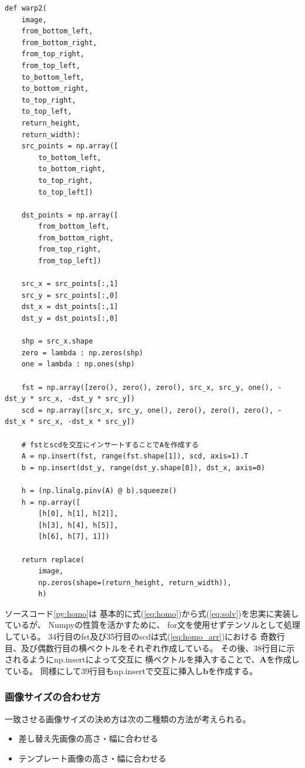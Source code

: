 \begin{lstlisting}[caption=ホモグラフィ行列によるワーピング, label=py:homo]
def warp2(    
    image,
    from_bottom_left,
    from_bottom_right,
    from_top_right,
    from_top_left,
    to_bottom_left,
    to_bottom_right,
    to_top_right,
    to_top_left,
    return_height,
    return_width):
    src_points = np.array([
        to_bottom_left,
        to_bottom_right,
        to_top_right,
        to_top_left])

    dst_points = np.array([
        from_bottom_left, 
        from_bottom_right,
        from_top_right,
        from_top_left])

    src_x = src_points[:,1]
    src_y = src_points[:,0]
    dst_x = dst_points[:,1]
    dst_y = dst_points[:,0]

    shp = src_x.shape
    zero = lambda : np.zeros(shp)
    one = lambda : np.ones(shp)

    fst = np.array([zero(), zero(), zero(), src_x, src_y, one(), -dst_y * src_x, -dst_y * src_y])
    scd = np.array([src_x, src_y, one(), zero(), zero(), zero(), -dst_x * src_x, -dst_x * src_y])

    # fstとscdを交互にインサートすることでAを作成する
    A = np.insert(fst, range(fst.shape[1]), scd, axis=1).T
    b = np.insert(dst_y, range(dst_y.shape[0]), dst_x, axis=0)

    h = (np.linalg.pinv(A) @ b).squeeze()
    h = np.array([
        [h[0], h[1], h[2]],
        [h[3], h[4], h[5]],
        [h[6], h[7], 1]])

    return replace(
        image,
        np.zeros(shape=(return_height, return_width)),
        h)
\end{lstlisting}
ソースコード\ref{py:homo}は
基本的に式(\ref{eq:homo})から式(\ref{eq:solv})を忠実に実装しているが、
Numpyの性質を活かすために、
for文を使用せずテンソルとして処理している。
34行目のfst及び35行目のscdは式(\ref{eq:homo_arr})における
奇数行目、及び偶数行目の横ベクトルをそれぞれ作成している。
その後、38行目に示されるようにnp.insertによって交互に
横ベクトルを挿入することで、$\bm{A}$を作成している。
同様にして39行目もnp.insertで交互に挿入し$\bm{b}$を作成する。

\subsubsection{画像サイズの合わせ方}\label{sec:size}
一致させる画像サイズの決め方は次の二種類の方法が考えられる。
\begin{itemize}
    \item 差し替え先画像の高さ・幅に合わせる
    \item テンプレート画像の高さ・幅に合わせる
\end{itemize}

